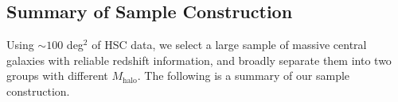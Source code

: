 \documentclass{emulateapj}
\def\mhalo{{$M_{\mathrm{halo}}$}}
\newcommand{\alexie}[1]{\textcolor{blue}{\textbf{[Alexie: #1]}}}
\begin{document}
\begin{CJK*}{UTF8}{gbsn}

\subsection{Summary of Sample Construction}
    \label{ssec:sample}

    Using $\sim 100$ deg$^2$ of HSC data, we select a large sample of massive central 
    galaxies with reliable redshift information, and broadly separate them into two 
    groups with different \mhalo{}. 
    The following is a summary of our sample construction.
    

\end{CJK*}
\end{document}
